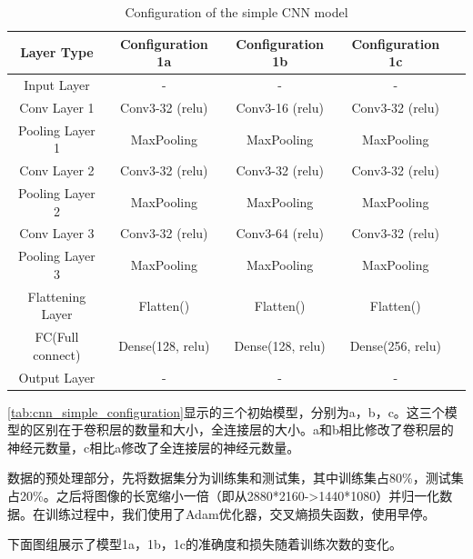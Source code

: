 \begin{table}
\centering
\caption{Configuration of the simple CNN model}
\begin{tabular}{ccccc}
    \toprule
    \textbf{Layer Type} & \textbf{Configuration 1a} & \textbf{Configuration 1b} & \textbf{Configuration 1c} \\
    \midrule
    Input Layer & - & - & - \\
    Conv Layer 1 & Conv3-32 (relu) & Conv3-16 (relu) & Conv3-32 (relu) \\
    Pooling Layer 1 & MaxPooling & MaxPooling& MaxPooling \\
    Conv Layer 2 & Conv3-32 (relu) & Conv3-32 (relu) & Conv3-32 (relu) \\
    Pooling Layer 2 & MaxPooling & MaxPooling& MaxPooling \\
    Conv Layer 3 & Conv3-32 (relu) & Conv3-64 (relu) & Conv3-32 (relu) \\
    Pooling Layer 3 & MaxPooling & MaxPooling& MaxPooling \\
    Flattening Layer & Flatten() & Flatten() & Flatten() \\
    FC(Full connect) & Dense(128, relu) & Dense(128, relu) & Dense(256, relu) \\
    Output Layer & - & - & - \\
    \bottomrule
\end{tabular}
\label{tab:cnn_simple_configuration}
\end{table}

\autoref{tab:cnn_simple_configuration}显示的三个初始模型，分别为a，b，c。这三个模型的区别在于卷积层的数量和大小，全连接层的大小。a和b相比修改了卷积层的神经元数量，c相比a修改了全连接层的神经元数量。

数据的预处理部分，先将数据集分为训练集和测试集，其中训练集占80\%，测试集占20\%。之后将图像的长宽缩小一倍（即从2880*2160->1440*1080）并归一化数据。在训练过程中，我们使用了Adam优化器，交叉熵损失函数，使用早停。

下面图组展示了模型1a，1b，1c的准确度和损失随着训练次数的变化。

